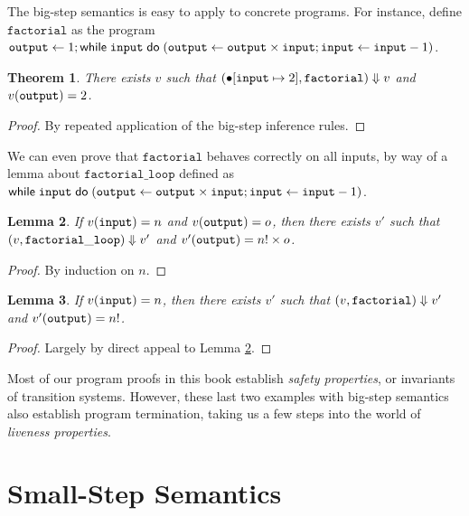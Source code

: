\documentclass{amsbook}
\newtheorem{theorem}{Theorem}[chapter]
\newtheorem{lemma}[theorem]{Lemma}
\theoremstyle{definition}
\theoremstyle{remark}
\numberwithin{section}{chapter}
\numberwithin{equation}{chapter}
\begin{document}
The big-step semantics is easy to apply to concrete programs.
For instance, define $\mathtt{factorial}$ as the program $\mathtt{output} \leftarrow 1; \mathsf{while} \; \mathtt{input} \; \mathsf{do} \; (\mathtt{output} \leftarrow \mathtt{output} \times \mathtt{input}; \mathtt{input} \leftarrow \mathtt{input} - 1)$.

\begin{theorem}
  There exists $v$ such that $(\bullet[\mathtt{input} \mapsto 2], \mathtt{factorial}) \Downarrow v$ and $v(\mathtt{output}) = 2$.
\end{theorem}

\begin{proof}
  By repeated application of the big-step inference rules.
\end{proof}

We can even prove that $\mathtt{factorial}$ behaves correctly on all inputs, by way of a lemma about $\mathtt{factorial\_loop}$ defined as $\mathsf{while} \; \mathtt{input} \; \mathsf{do} \; (\mathtt{output} \leftarrow \mathtt{output} \times \mathtt{input}; \mathtt{input} \leftarrow \mathtt{input} - 1)$.

\begin{lemma}\label{factorial_loop}
  If $v(\mathtt{input}) = n$ and $v(\mathtt{output}) = o$, then there exists $v'$ such that $(v, \mathtt{factorial\_loop}) \Downarrow v'$ and $v'(\mathtt{output}) = n! \times o$.
\end{lemma}

\begin{proof}
  By induction on $n$.
\end{proof}

\begin{lemma}
  If $v(\mathtt{input}) = n$, then there exists $v'$ such that $(v, \mathtt{factorial}) \Downarrow v'$ and $v'(\mathtt{output}) = n!$.
\end{lemma}

\begin{proof}
  Largely by direct appeal to Lemma \ref{factorial_loop}.
\end{proof}

Most of our program proofs in this book establish \emph{safety properties}, or invariants of transition systems.
However, these last two examples with big-step semantics also establish program termination, taking us a few steps into the world of \emph{liveness properties}.


\section{Small-Step Semantics}
\end{document}
